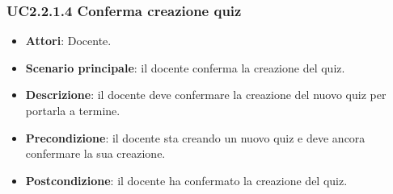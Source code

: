\subsubsection{UC2.2.1.4 Conferma creazione quiz}
\begin{itemize}
\item \textbf{Attori}: Docente.
\item \textbf{Scenario principale}: il docente conferma la creazione del quiz.
\item \textbf{Descrizione}: il docente deve confermare la creazione del nuovo quiz per portarla a termine.
\item \textbf{Precondizione}: il docente sta creando un nuovo quiz e deve ancora confermare la sua creazione.
\item \textbf{Postcondizione}: il docente ha confermato la creazione del quiz.
\end{itemize}
